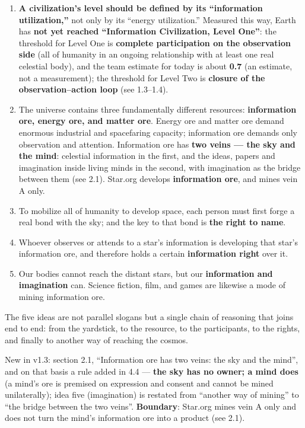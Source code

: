 \documentclass[11pt,fontset=none]{ctexart}
\begin{document}
\begin{enumerate}
  \item \textbf{A civilization's level should be defined by its ``information utilization,''} not only by its ``energy utilization.'' Measured this way, Earth has \textbf{not yet reached ``Information Civilization, Level One''}: the threshold for Level One is \textbf{complete participation on the observation side} (all of humanity in an ongoing relationship with at least one real celestial body), and the team estimate for today is about \textbf{0.7} (an estimate, not a measurement); the threshold for Level Two is \textbf{closure of the observation--action loop} (see 1.3--1.4).
  \item The universe contains three fundamentally different resources: \textbf{information ore, energy ore, and matter ore}. Energy ore and matter ore demand enormous industrial and spacefaring capacity; information ore demands only observation and attention. Information ore has \textbf{two veins --- the sky and the mind}: celestial information in the first, and the ideas, papers and imagination inside living minds in the second, with imagination as the bridge between them (see 2.1). Star.org develops \textbf{information ore}, and mines vein A only.
  \item To mobilize all of humanity to develop space, each person must first forge a real bond with the sky; and the key to that bond is \textbf{the right to name}.
  \item Whoever observes or attends to a star's information is developing that star's information ore, and therefore holds a certain \textbf{information right} over it.
  \item Our bodies cannot reach the distant stars, but our \textbf{information and imagination} can. Science fiction, film, and games are likewise a mode of mining information ore.
\end{enumerate}

The five ideas are not parallel slogans but a single chain of reasoning that joins end to end: from the yardstick, to the resource, to the participants, to the rights, and finally to another way of reaching the cosmos.

\vspace{4mm}

{\small\color{inkfaint}New in v1.3: section 2.1, ``Information ore has two veins: the sky and the mind'', and on that basis a rule added in 4.4 --- \textbf{the sky has no owner; a mind does} (a mind's ore is premised on expression and consent and cannot be mined unilaterally); idea five (imagination) is restated from ``another way of mining'' to ``the bridge between the two veins''. \textbf{Boundary}: Star.org mines vein A only and does not turn the mind's information ore into a product (see 2.1).\par}
\end{document}
